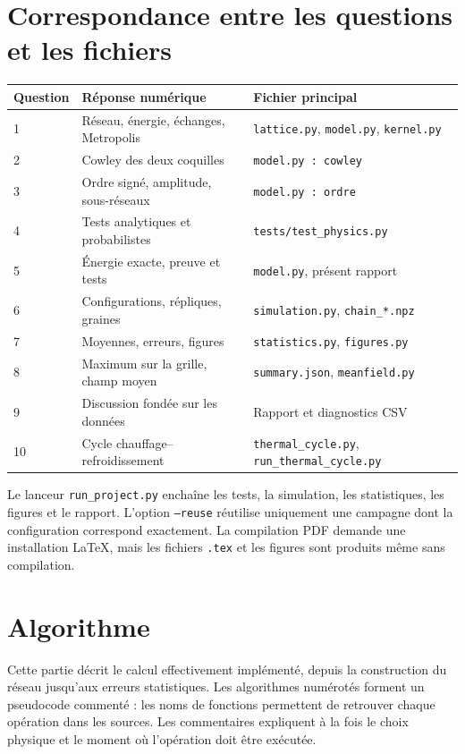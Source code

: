 \documentclass[10pt,a4paper]{article}
\begin{document}
\appendix
\section{Correspondance entre les questions et les fichiers}
\begin{center}\small
\begin{tabular}{p{.12\linewidth}p{.40\linewidth}p{.38\linewidth}}
\toprule
Question & Réponse numérique & Fichier principal\\
\midrule
1 & Réseau, énergie, échanges, Metropolis & \texttt{lattice.py}, \texttt{model.py}, \texttt{kernel.py}\\
2 & Cowley des deux coquilles & \texttt{model.py : cowley}\\
3 & Ordre signé, amplitude, sous-réseaux & \texttt{model.py : ordre}\\
4 & Tests analytiques et probabilistes & \texttt{tests/test\_physics.py}\\
5 & Énergie exacte, preuve et tests & \texttt{model.py}, présent rapport\\
6 & Configurations, répliques, graines & \texttt{simulation.py}, \texttt{chain\_*.npz}\\
7 & Moyennes, erreurs, figures & \texttt{statistics.py}, \texttt{figures.py}\\
8 & Maximum sur la grille, champ moyen & \texttt{summary.json}, \texttt{meanfield.py}\\
9 & Discussion fondée sur les données & Rapport et diagnostics CSV\\
10 & Cycle chauffage--refroidissement & \texttt{thermal\_cycle.py}, \texttt{run\_thermal\_cycle.py}\\
\bottomrule
\end{tabular}\end{center}

Le lanceur \texttt{run\_project.py} enchaîne les tests, la simulation, les
statistiques, les figures et le rapport. L'option \texttt{--reuse} réutilise
uniquement une campagne dont la configuration correspond exactement.
La compilation PDF demande une installation LaTeX, mais les fichiers
\texttt{.tex} et les figures sont produits même sans compilation.

\clearpage
\section{Algorithme}
\begingroup\small
\label{sec:algorithme}

Cette partie décrit le calcul effectivement implémenté, depuis la construction
du réseau jusqu'aux erreurs statistiques. Les algorithmes numérotés forment un
pseudocode commenté : les noms de fonctions permettent de retrouver chaque
opération dans les sources. Les commentaires expliquent à la fois le choix
physique et le moment où l'opération doit être exécutée.
\end{document}
